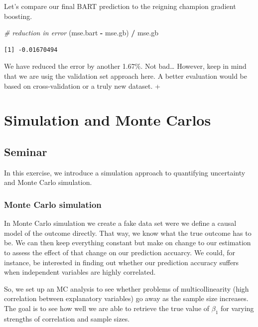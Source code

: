 \documentclass[]{article}
\newenvironment{Shaded}{\begin{snugshade}}{\end{snugshade}}
\newcommand{\CommentTok}[1]{\textcolor[rgb]{0.56,0.35,0.01}{\textit{#1}}}
\newcommand{\NormalTok}[1]{#1}
\newcommand{\OperatorTok}[1]{\textcolor[rgb]{0.81,0.36,0.00}{\textbf{#1}}}
\newcommand{\StringTok}[1]{\textcolor[rgb]{0.31,0.60,0.02}{#1}}
\begin{document}
Let's compare our final BART prediction to the reigning champion gradient boosting.

\begin{Shaded}
\begin{Highlighting}[]
\CommentTok{# reduction in error}
\NormalTok{(mse.bart }\OperatorTok{-}\StringTok{ }\NormalTok{mse.gb) }\OperatorTok{/}\StringTok{ }\NormalTok{mse.gb}
\end{Highlighting}
\end{Shaded}

\begin{verbatim}
[1] -0.01670494
\end{verbatim}

We have reduced the error by another 1.67\(\%\). Not bad\ldots{} However, keep in mind that we are usig the validation set approach here. A better evaluation would be based on cross-validation or a truly new dataset.
+

\hypertarget{simulation-and-monte-carlos}{%
\section{Simulation and Monte Carlos}\label{simulation-and-monte-carlos}}

\hypertarget{seminar-6}{%
\subsection{Seminar}\label{seminar-6}}

In this exercise, we introduce a simulation approach to quantifying uncertainty and Monte Carlo simulation.

\hypertarget{monte-carlo-simulation}{%
\subsubsection{Monte Carlo simulation}\label{monte-carlo-simulation}}

In Monte Carlo simulation we create a fake data set were we define a causal model of the outcome directly. That way, we know what the true outcome has to be. We can then keep everything constant but make on change to our estimation to assess the effect of that change on our prediction accuarcy. We could, for instance, be interested in finding out whether our prediction accuracy suffers when independent variables are highly correlated.

So, we set up an MC analysis to see whether problems of multicollinearity (high correlation between explanatory variables) go away as the sample size increases. The goal is to see how well we are able to retrieve the true value of \(\beta_{1}\) for varying strengths of correlation and sample sizes.
\end{document}
